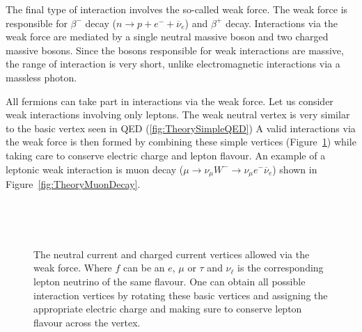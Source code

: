 The final type of interaction involves the so-called weak force. The weak force is responsible for $\beta^{-}$ decay ($n\rightarrow p +e^{-}+\overline{\nu}_{e}$) and $\beta^{+}$ decay. Interactions via the weak force are mediated by a single neutral massive boson and two charged massive bosons. Since the bosons responsible for weak interactions are massive, the range of interaction is very short, unlike electromagnetic interactions via a massless photon.

All fermions can take part in interactions via the weak force. Let us consider weak interactions involving only leptons. The weak neutral vertex is very similar to the basic vertex seen in QED (\ref{fig:TheorySimpleQED}) A valid interactions via the weak force is then formed by combining these simple vertices (Figure~\ref{fig:TheoryWeakVertexes}) while taking care to conserve electric charge and lepton flavour. An example of a leptonic weak interaction is muon decay ($\mu\rightarrow \nu_{\mu}W^{-}\rightarrow \nu_{\mu}e^{-}\overline{\nu}_{e}$) shown in Figure~\ref{fig:TheoryMuonDecay}.

\begin{figure}
  \begin{minipage}[][][t]{.32\textwidth}
    \centering
    
     \label{fig:TheoryWeakNeutralFermions}
  \end{minipage}
  \,
  \begin{minipage}[][][t]{.32\textwidth}
    \centering
    
     \label{fig:TheoryWeakChargedLeptons}
  \end{minipage}
  \,
  \begin{minipage}[][][t]{.32\textwidth}
    \centering
    
     \label{fig:TheoryWeakChargedQuarks}
  \end{minipage}

  \caption{The neutral current and charged current vertices allowed via the weak force. Where $f$ can be an $e$, $\mu$ or $\tau$ and $\nu_{\ell}$ is the corresponding lepton neutrino of the same flavour. 
  One can obtain all possible interaction vertices by rotating these basic vertices and assigning the appropriate electric charge and making sure to conserve lepton flavour across the vertex.} \label{fig:TheoryWeakVertexes}
\end{figure}

